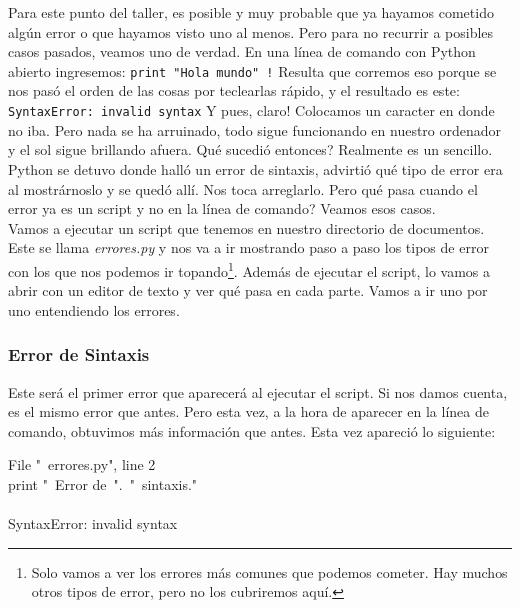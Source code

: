 \documentclass[10pt,letterpaper]{article}
\newcommand{\inlinecode}[1]{
\colorbox{light-gray}{\texttt{#1}}
}
\newenvironment{Code}
{
\begin{lrbox}{\selvestebox}%
\begin{minipage}{\dimexpr\columnwidth-2\fboxsep\relax}
\fontfamily{\ttdefault}\selectfont
}
{\end{minipage}\end{lrbox}%
\begin{center}
\colorbox{light-gray}{\usebox{\selvestebox}}
\end{center}
}
\begin{document}
Para este punto del taller, es posible y muy probable que ya hayamos cometido alg\'un error o que hayamos visto uno al menos. Pero para no recurrir a posibles casos pasados, veamos uno de verdad. En una l\'inea de comando con Python abierto ingresemos: \inlinecode{print "Hola mundo"\ \hspace{-2mm}!} Resulta que corremos eso porque se nos pas\'o el orden de las cosas por teclearlas r\'apido, y el resultado es este: \inlinecode{\color{red} SyntaxError: invalid syntax} Y pues, claro! Colocamos un caracter en donde no iba. Pero nada se ha arruinado, todo sigue funcionando en nuestro ordenador y el sol sigue brillando afuera. Qu\'e sucedi\'o entonces? Realmente es un sencillo. Python se detuvo donde hall\'o un error de sintaxis, advirti\'o qu\'e tipo de error era al mostr\'arnoslo y se qued\'o all\'i. Nos toca arreglarlo. Pero qu\'e pasa cuando el error ya es un script y no en la l\'inea de comando? Veamos esos casos.\\

Vamos a ejecutar un script que tenemos en nuestro directorio de documentos. Este se llama \textit{errores.py} y nos va a ir mostrando paso a paso los tipos de error con los que nos podemos ir topando\footnote{Solo vamos a ver los errores m\'as comunes que podemos cometer. Hay muchos otros tipos de error, pero no los cubriremos aqu\'i.}. Adem\'as de ejecutar el script, lo vamos a abrir con un editor de texto y ver qu\'e pasa en cada parte. Vamos a ir uno por uno entendiendo los errores.\\

\subsubsection{Error de Sintaxis}
Este ser\'a el primer error que aparecer\'a al ejecutar el script. Si nos damos cuenta, es el mismo error que antes. Pero esta vez, a la hora de aparecer en la l\'inea de comando, obtuvimos m\'as informaci\'on que antes. Esta vez apareci\'o lo siguiente:

\begin{Code}
{\color{red} \hspace*{4mm} File "\ \hspace{-2mm}errores.py", line 2\\
\hspace*{8mm} print "\ \hspace{-2mm}Error de\ ".\ "\ \hspace{-2mm}sintaxis."\\
\hspace*{63mm}\^\\
SyntaxError: invalid syntax}
\end{Code}
\end{document}
